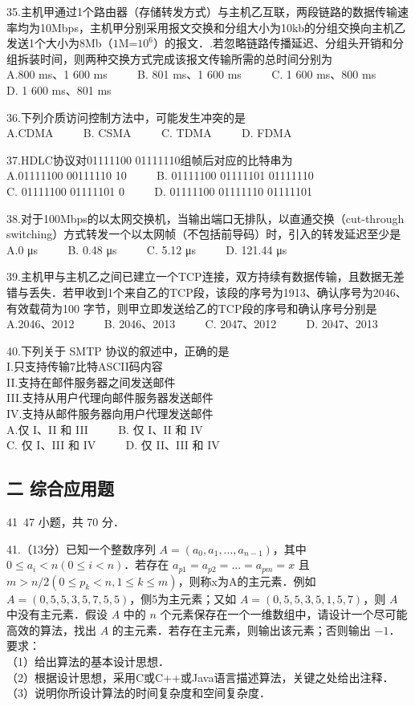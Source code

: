 35.主机甲通过1个路由器（存储转发方式）与主机乙互联，两段链路的数据传输速率均为10Mbps，主机甲分别采用报文交换和分组大小为10kb的分组交换向主机乙发送1个大小为8Mb（$1$M=$10^6$）的报文．.若忽略链路传播延迟、分组头开销和分组拆装时间，则两种交换方式完成该报文传输所需的总时间分别为 \\
A.800 ms、1 600 ms $\qquad$ B. 801 ms、1 600 ms $\qquad$ C. 1 600 ms、800 ms $\qquad$ D. 1 600 ms、801 ms

36.下列介质访问控制方法中，可能发生冲突的是 \\
A.CDMA $\qquad$ B. CSMA $\qquad$ C. TDMA $\qquad$ D. FDMA 

37.HDLC协议对01111100 01111110组帧后对应的比特串为 \\
A.01111100 00111110 10 $\qquad$ B. 01111100 01111101 01111110  \\
C. 01111100 01111101 0 $\qquad$ D. 01111100 01111110 01111101 

38.对于100Mbps的以太网交换机，当输出端口无排队，以直通交换（cut-through switching）方式转发一个以太网帧（不包括前导码）时，引入的转发延迟至少是 \\
A.0 μs $\qquad$ B. 0.48 μs $\qquad$ C. 5.12 μs $\qquad$ D. 121.44 μs

39.主机甲与主机乙之间已建立一个TCP连接，双方持续有数据传输，且数据无差错与丢失．若甲收到1个来自乙的TCP段，该段的序号为1913、确认序号为2046、有效载荷为100 字节，则甲立即发送给乙的TCP段的序号和确认序号分别是 \\
A.2046、2012 $\qquad$ B. 2046、2013 $\qquad$ C. 2047、2012 $\qquad$ D. 2047、2013

40.下列关于 SMTP 协议的叙述中，正确的是 \\
I.只支持传输7比特ASCII码内容 \\
II.支持在邮件服务器之间发送邮件 \\
III.支持从用户代理向邮件服务器发送邮件 \\
IV.支持从邮件服务器向用户代理发送邮件 \\
A.仅 I、II 和 III $\qquad$ B. 仅 I、II 和 IV \\
C. 仅 I、III 和 IV $\qquad$ D. 仅 II、III 和 IV

\subsection{二 综合应用题}
41~47 小题，共 70 分．

41.（13分）已知一个整数序列 $A=(a_0, a_1,...,a_{n-1})$，其中 $0 \leq a_i<n(0 \leq i < n)$．若存在 $a_{p1}=a_{p2}=...=a_{pm}=x$ 且 $m>n/2(0 \leq p_k < n, 1 \leq k \leq m)$，则称x为A的主元素．例如 $A=(0,5,5,3,5,7,5,5)$，侧5为主元素；又如 $A=(0,5,5,3,5,1,5,7)$，则 $A$ 中没有主元素．假设 $A$ 中的 $n$ 个元素保存在一个一维数组中，请设计一个尽可能高效的算法，找出 $A$ 的主元素．若存在主元素，则输出该元素；否则输出 $-1$．要求： \\
（1）给出算法的基本设计思想． \\
（2）根据设计思想，采用C或C++或Java语言描述算法，关键之处给出注释． \\
（3）说明你所设计算法的时间复杂度和空间复杂度．


